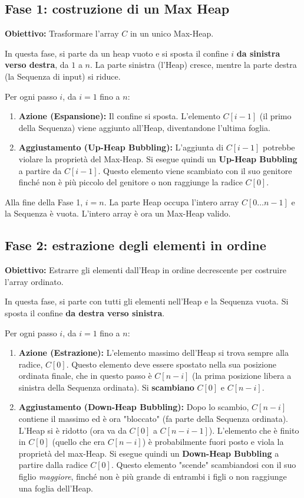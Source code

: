 \clearpage
\subsection*{Fase 1: costruzione di un Max Heap}
\textbf{Obiettivo:} Trasformare l'array $C$ in un unico Max-Heap.

\vspace{1\baselineskip}
\noindent
In questa fase, si parte da un heap vuoto e si sposta il confine $i$ \textbf{da sinistra verso destra}, da $1$ a $n$. La parte sinistra (l'Heap) cresce, mentre la parte destra (la Sequenza di input) si riduce.

Per ogni passo $i$, da $i=1$ fino a $n$:
\begin{enumerate}
    \item \textbf{Azione (Espansione):} Il confine si sposta. L'elemento $C[i-1]$ (il primo della Sequenza) viene aggiunto all'Heap, diventandone l'ultima foglia.
    \item \textbf{Aggiustamento (Up-Heap Bubbling):} L'aggiunta di $C[i-1]$ potrebbe violare la proprietà del Max-Heap. Si esegue quindi un \textbf{Up-Heap Bubbling} a partire da $C[i-1]$. Questo elemento viene scambiato con il suo genitore finché non è più piccolo del genitore o non raggiunge la radice $C[0]$.
\end{enumerate}

\noindent
Alla fine della Fase 1, $i=n$. La parte Heap occupa l'intero array $C[0 \dots n-1]$ e la Sequenza è vuota. L'intero array è ora un Max-Heap valido.

\subsection*{Fase 2: estrazione degli elementi in ordine}
\textbf{Obiettivo:} Estrarre gli elementi dall'Heap in ordine decrescente per costruire l'array ordinato.

\vspace{1\baselineskip}
\noindent
In questa fase, si parte con tutti gli elementi nell'Heap e la Sequenza vuota. Si sposta il confine \textbf{da destra verso sinistra}.

Per ogni passo $i$, da $i=1$ fino a $n$:
\begin{enumerate}
    \item \textbf{Azione (Estrazione):} L'elemento massimo dell'Heap si trova sempre alla radice, $C[0]$. Questo elemento deve essere spostato nella sua posizione ordinata finale, che in questo passo è $C[n-i]$ (la prima posizione libera a sinistra della Sequenza ordinata). Si \textbf{scambiano} $C[0]$ e $C[n-i]$.
    \item \textbf{Aggiustamento (Down-Heap Bubbling):} Dopo lo scambio, $C[n-i]$ contiene il massimo ed è ora "bloccato" (fa parte della Sequenza ordinata). L'Heap si è ridotto (ora va da $C[0]$ a $C[n-i-1]$). L'elemento che è finito in $C[0]$ (quello che era $C[n-i]$) è probabilmente fuori posto e viola la proprietà del max-Heap. Si esegue quindi un \textbf{Down-Heap Bubbling} a partire dalla radice $C[0]$. Questo elemento "scende" scambiandosi con il suo figlio \textit{maggiore}, finché non è più grande di entrambi i figli o non raggiunge una foglia dell'Heap.
\end{enumerate}

